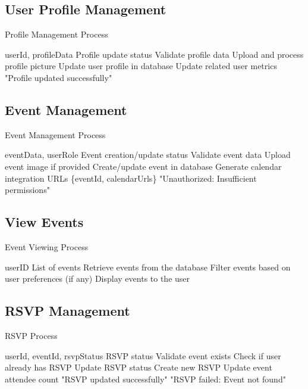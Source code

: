 \subsection{User Profile Management}
\begin{algorithm}[H]
\caption{Profile Management Process}\label{alg:profile}
\begin{algorithmic}[1]
\Require userId, profileData
\Ensure Profile update status
\State Validate profile data
    \State Upload and process profile picture
\EndIf
\State Update user profile in database
\State Update related user metrics
\State \Return "Profile updated successfully"
\end{algorithmic}
\end{algorithm}

\subsection{Event Management}
\begin{algorithm}[H]
\caption{Event Management Process}\label{alg:event}
\begin{algorithmic}[1]
\Require eventData, userRole
\Ensure Event creation/update status
\State Validate event data
    \State Upload event image if provided
    \State Create/update event in database
    \State Generate calendar integration URLs
    \State \Return \{eventId, calendarUrls\}
\Else
    \State \Return "Unauthorized: Insufficient permissions"
\EndIf
\end{algorithmic}
\end{algorithm}

\subsection{View Events}
\begin{algorithm}[H]
\caption{Event Viewing Process}\label{alg:view_events}
\begin{algorithmic}[1]
\Require userID
\Ensure List of events
\State Retrieve events from the database
\State Filter events based on user preferences (if any)
\State Display events to the user
\end{algorithmic}
\end{algorithm}

\subsection{RSVP Management}
\begin{algorithm}[H]
\caption{RSVP Process}\label{alg:rsvp}
\begin{algorithmic}[1]
\Require userId, eventId, rsvpStatus
\Ensure RSVP status
\State Validate event exists
    \State Check if user already has RSVP
        \State Update RSVP status
    \Else
        \State Create new RSVP
    \EndIf
    \State Update event attendee count
    \State \Return "RSVP updated successfully"
\Else
    \State \Return "RSVP failed: Event not found"
\EndIf
\end{algorithmic}
\end{algorithm}

